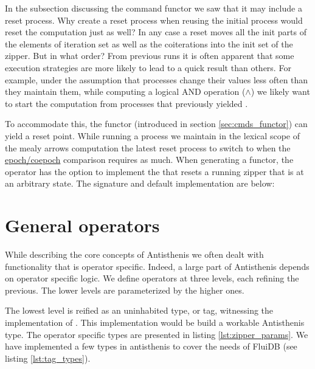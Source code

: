 In the subsection discussing the command functor we saw that it may
include a reset process. Why create a reset process when reusing the
initial process would reset the computation just as well? In any case
a reset moves all the init parts of the elements of iteration set as
well as the coiterations into the init set of the zipper. But in what
order? From previous runs it is often apparent that some execution
strategies are more likely to lead to a quick result than others. For
example, under the assumption that processes change their values less
often than they maintain them, while computing a logical AND operation
(\(\land\)) we likely want to start the computation from processes
that previously yielded .

To accommodate this, the  functor (introduced in section
\ref{sec:cmds_functor}) can yield a reset point. While running a
process we maintain in the lexical scope of the mealy arrows
computation the latest reset process to switch to when the
\hyperref[sec:epochs_coepochs]{epoch/coepoch} comparison requires as
much. When generating a  functor, the operator has the
option to implement the  that resets a running zipper
that is at an arbitrary state. The signature and default
implementation are below:


\section{General operators}
\label{sec:antisthenis_ops}

While describing the core concepts of Antisthenis we often dealt with
functionality that is operator specific. Indeed, a large part of
Antisthenis depends on operator specific logic. We define operators at
three levels, each refining the previous. The lower levels are
parameterized by the higher ones.

The lowest level is reified as an uninhabited type, or tag, witnessing
the implementation of . This implementation would
be build a workable Antisthenis type. The operator specific types are
presented in listing \ref{lst:zipper_params}. We have implemented a few types
in antisthenis to cover the needs of FluiDB (see listing
\ref{lst:tag_types}).


